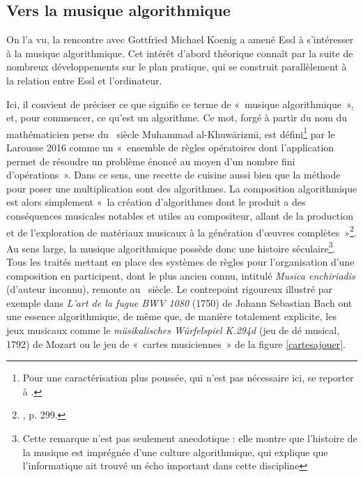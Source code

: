 \documentclass[a4paper,12pt]{article}
\newcommand{\guill}[1]{«~#1~»}
\begin{document}
\subsection{Vers la musique algorithmique}
\label{parcoursalgo}

On l'a vu, la rencontre avec Gottfried Michael Koenig a amené Essl à s'intéresser à la musique algorithmique. Cet intérêt d'abord théorique connaît par la suite de nombreux développements sur le plan pratique, qui se construit parallèlement à la relation entre Essl et l'ordinateur.

Ici, il convient de préciser ce que signifie ce terme de \guill{musique algorithmique}, et, pour commencer, ce qu'est un algorithme. Ce mot, forgé à partir du nom du mathématicien perse du \IXe~siècle Muhammad al-Khuw\=arizm\=\i, est défini\footnote{Pour une caractérisation plus poussée, qui n'est pas nécessaire ici, se reporter à \cite{knuth1998art}.} par le Larousse 2016 comme un \guill{ensemble de règles opératoires dont l'application permet de résoudre un problème énoncé au moyen d'un nombre fini d'opérations}. Dans ce sens, une recette de cuisine aussi bien que la méthode pour poser une multiplication sont des algorithmes. La composition algorithmique est alors simplement \guill{la création d'algorithmes dont le produit a des conséquences musicales notables et utiles au compositeur, allant de la production et de l'exploration de matériaux musicaux à la génération d'œuvres complètes}\footnote{\cite{collins2010introduction}, p. 299.}. \\
Au sens large, la musique algorithmique possède donc une histoire séculaire\footnote{Cette remarque n'est pas seulement anecdotique : elle montre que l'histoire de la musique est imprégnée d'une culture algorithmique, qui explique que l'informatique ait trouvé un écho important dans cette discipline}. Tous les traités mettant en place des systèmes de règles pour l'organisation d'une composition en participent, dont le plus ancien connu, intitulé \emph{Musica enchiriadis} (d'auteur inconnu), remonte au \IXe~siècle. Le contrepoint rigoureux illustré par exemple dans \emph{L'art de la fugue BWV 1080} (1750) de Johann Sebastian Bach ont une essence algorithmique, de même que, de manière totalement explicite, les jeux musicaux comme le \emph{müsikalisches Würfelspiel K.294d} (jeu de dé musical, 1792) de Mozart ou le jeu de \guill{cartes musiciennes} de la figure \ref{cartesajouer}. \\
\end{document}
